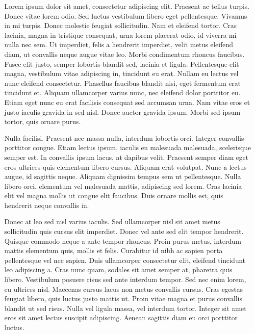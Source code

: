 \documentclass[bsc, classic, a4paper]{ufbathesis}
\begin{document}
Lorem ipsum dolor sit amet, consectetur adipiscing elit. Praesent ac tellus turpis. Donec vitae lorem odio. Sed luctus vestibulum libero eget pellentesque. Vivamus in mi turpis. Donec molestie feugiat sollicitudin. Nam et eleifend tortor. Cras lacinia, magna in tristique consequat, urna lorem placerat odio, id viverra mi nulla nec sem. Ut imperdiet, felis a hendrerit imperdiet, velit metus eleifend diam, ut convallis neque augue vitae leo. Morbi condimentum rhoncus faucibus. Fusce elit justo, semper lobortis blandit sed, lacinia et ligula. Pellentesque elit magna, vestibulum vitae adipiscing in, tincidunt eu erat. Nullam eu lectus vel nunc eleifend consectetur. Phasellus faucibus blandit nisi, eget fermentum erat tincidunt et. Aliquam ullamcorper varius nunc, nec eleifend dolor porttitor eu. Etiam eget nunc eu erat facilisis consequat sed accumsan urna. Nam vitae eros et justo iaculis gravida in sed nisl. Donec auctor gravida ipsum. Morbi sed ipsum tortor, quis ornare purus.

Nulla facilisi. Praesent nec massa nulla, interdum lobortis orci. Integer convallis porttitor congue. Etiam lectus ipsum, iaculis eu malesuada malesuada, scelerisque semper est. In convallis ipsum lacus, at dapibus velit. Praesent semper diam eget eros ultrices quis elementum libero cursus. Aliquam erat volutpat. Nunc a lectus augue, id sagittis neque. Aliquam dignissim tempus sem ut pellentesque. Nulla libero orci, elementum vel malesuada mattis, adipiscing sed lorem. Cras lacinia elit vel magna mollis ut congue elit faucibus. Duis ornare mollis est, quis hendrerit neque convallis in.

Donec at leo sed nisl varius iaculis. Sed ullamcorper nisl sit amet metus sollicitudin quis cursus elit imperdiet. Donec vel ante sed elit tempor hendrerit. Quisque commodo neque a ante tempor rhoncus. Proin purus metus, interdum mattis elementum quis, mollis et felis. Curabitur id nibh ac sapien porta pellentesque vel nec sapien. Duis ullamcorper consectetur elit, eleifend tincidunt leo adipiscing a. Cras nunc quam, sodales sit amet semper at, pharetra quis libero. Vestibulum posuere risus sed ante interdum tempor. Sed nec enim lorem, eu ultrices nisl. Maecenas cursus lacus non metus convallis cursus. Cras egestas feugiat libero, quis luctus justo mattis ut. Proin vitae magna et purus convallis blandit ut sed risus. Nulla vel ligula massa, vel interdum tortor. Integer sit amet eros sit amet lectus suscipit adipiscing. Aenean sagittis diam eu orci porttitor luctus.
\end{document}
